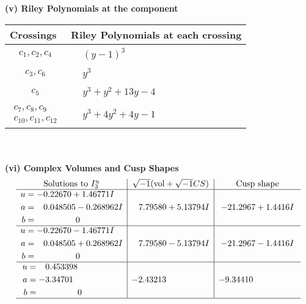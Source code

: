 \documentclass[1p]{elsarticle_modified}
\theoremstyle{definition}
\newcommand{\I}{\sqrt{-1}}
\begin{document}
\newpage\renewcommand{\arraystretch}{1}
\flushleft \textbf{(v) Riley Polynomials at the component}\newline \\
\begin{tabular}{m{50pt}|m{274pt}}
Crossings & \hspace{64pt}Riley Polynomials at each crossing \\
\hline $$\begin{aligned}c_{1},c_{2},c_{4}\end{aligned}$$&$\begin{aligned}
&(y-1)^3
\end{aligned}$\\
\hline $$\begin{aligned}c_{3},c_{6}\end{aligned}$$&$\begin{aligned}
&y^3
\end{aligned}$\\
\hline $$\begin{aligned}c_{5}\end{aligned}$$&$\begin{aligned}
&y^3+y^2+13 y-4
\end{aligned}$\\
\hline $$\begin{aligned}c_{7},c_{8},c_{9}\\c_{10},c_{11},c_{12}\end{aligned}$$&$\begin{aligned}
&y^3+4 y^2+4 y-1
\end{aligned}$\\
\hline
\end{tabular}\\~\\
\newpage\flushleft \textbf{(vi) Complex Volumes and Cusp Shapes}
$$\begin{array}{c|c|c}  
\text{Solutions to }I^u_{3}& \I (\text{vol} + \sqrt{-1}CS) & \text{Cusp shape}\\
 \hline 
\begin{aligned}
u &= -0.22670 + 1.46771 I \\
a &= \phantom{-}0.048505 - 0.268962 I \\
b &= \phantom{-0.000000 } 0\end{aligned}
 & \phantom{-}7.79580 + 5.13794 I & -21.2967 + 1.4416 I \\ \hline\begin{aligned}
u &= -0.22670 - 1.46771 I \\
a &= \phantom{-}0.048505 + 0.268962 I \\
b &= \phantom{-0.000000 } 0\end{aligned}
 & \phantom{-}7.79580 - 5.13794 I & -21.2967 - 1.4416 I \\ \hline\begin{aligned}
u &= \phantom{-}0.453398\phantom{ +0.000000I} \\
a &= -3.34701\phantom{ +0.000000I} \\
b &= \phantom{-0.000000 } 0\end{aligned}
 & -2.43213\phantom{ +0.000000I} & -9.34410\phantom{ +0.000000I}\\
 \hline 
 \end{array}$$\newpage\newpage\renewcommand{\arraystretch}{1}
\end{document}
